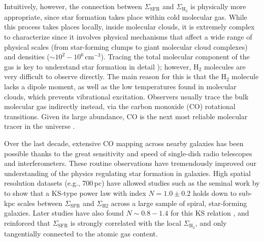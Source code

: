 \documentclass[longauth]{aa}
\begin{document}
Intuitively, however, the connection between $\Sigma_{\mathrm{SFR}}$ and $\Sigma_{\mathrm{H}_2}$ is physically more appropriate, since star formation takes place within cold molecular gas. While this process takes places locally, inside molecular clouds, it is extremely complex to characterize since it involves physical mechanisms that affect a wide range of physical scales (from star-forming clumps to giant molecular cloud complexes) and densities ($\sim 10^2-10^6\,\mathrm{cm}^{-3}$). Tracing the total molecular component of the gas is key to understand star formation in detail \citep[e.g.,][]{McKee2007,Lada2010,Lada2012,Longmore2013,Klessen2016}); however, H$_2$ molecules are very difficult to observe directly. The main reason for this is that the H$_2$ molecule lacks a dipole moment, as well as the low temperatures found in molecular clouds, which prevents vibrational excitation. Observers usually trace the bulk molecular gas indirectly instead, via the carbon monoxide (CO) rotational transitions. Given its large abundance, CO is the next most reliable molecular tracer in the universe \citep[for an in-depth review, see][]{Bolatto2013}. 

Over the last decade, extensive CO mapping across nearby galaxies has been possible thanks to the great sensitivity and speed of single-dish radio telescopes and interferometers. These routine observations have tremendously improved our understanding of the physics regulating star formation in galaxies. High spatial resolution datasets (e.g., 700\,pc) have allowed studies such as the seminal work by \citet{Bigiel2008} to show that a KS-type power law with index $N=1.0\pm0.2$ holds down to sub-kpc scales between $\Sigma_{\mathrm{SFR}}$ and $\Sigma_{\mathrm{H2}}$  across a large sample of spiral, star-forming galaxies. Later studies have also found $N\sim 0.8-1.4$ for this KS relation \citep[e.g.,][]{Blanc2009,Schruba2011,Leroy2013,Usero2015,Lin2019,Ellison2021,Pessa2021} , and reinforced that $\Sigma_{\mathrm{SFR}}$ is strongly correlated with the local $\Sigma_{\mathrm{H_2}}$, and only tangentially connected to the atomic gas content.
\end{document}

